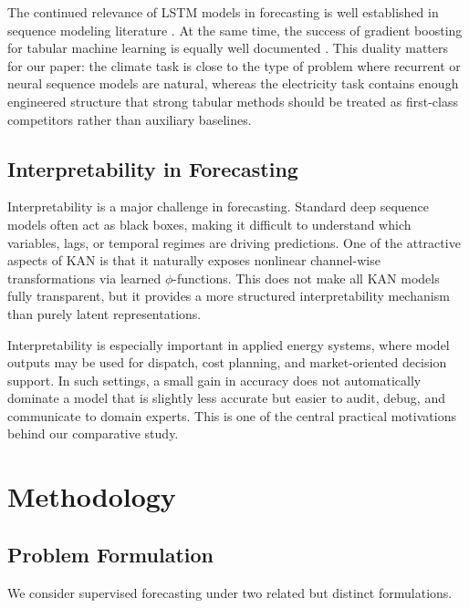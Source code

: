 \documentclass[10pt,conference,onecolumn]{IEEEtran}
\begin{document}
The continued relevance of LSTM models in forecasting is well established in sequence modeling literature \cite{hochreiter1997lstm}. At the same time, the success of gradient boosting for tabular machine learning is equally well documented \cite{friedman2001greedy,prokhorenkova2018catboost}. This duality matters for our paper: the climate task is close to the type of problem where recurrent or neural sequence models are natural, whereas the electricity task contains enough engineered structure that strong tabular methods should be treated as first-class competitors rather than auxiliary baselines.

\subsection{Interpretability in Forecasting}

Interpretability is a major challenge in forecasting. Standard deep sequence models often act as black boxes, making it difficult to understand which variables, lags, or temporal regimes are driving predictions. One of the attractive aspects of KAN is that it naturally exposes nonlinear channel-wise transformations via learned $\phi$-functions. This does not make all KAN models fully transparent, but it provides a more structured interpretability mechanism than purely latent representations.

Interpretability is especially important in applied energy systems, where model outputs may be used for dispatch, cost planning, and market-oriented decision support. In such settings, a small gain in accuracy does not automatically dominate a model that is slightly less accurate but easier to audit, debug, and communicate to domain experts. This is one of the central practical motivations behind our comparative study.

\section{Methodology}

\subsection{Problem Formulation}

We consider supervised forecasting under two related but distinct formulations.
\end{document}
